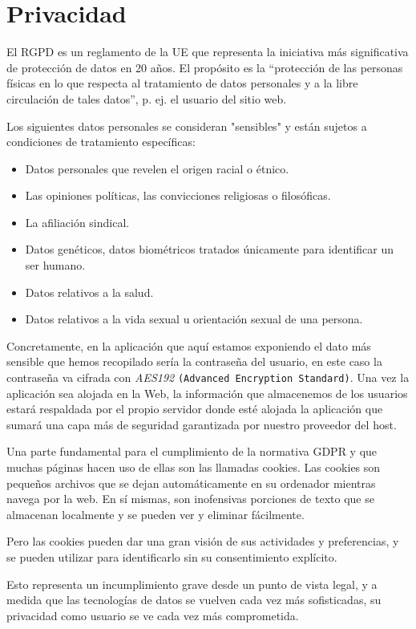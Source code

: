 \documentclass[a4paper, 12pt]{book}
\begin{document}
\section{Privacidad}
El RGPD es un reglamento de la UE que representa la iniciativa más significativa de protección de datos en 20 años. El propósito es la “protección de las personas físicas en lo que respecta al tratamiento de datos personales y a la libre circulación de tales datos”, p. ej. el usuario del sitio web.
 
Los siguientes datos personales se consideran "sensibles" y están sujetos a condiciones de tratamiento específicas:

\begin{itemize}
  \item Datos personales que revelen el origen racial o étnico.
  \item Las opiniones políticas, las convicciones religiosas o filosóficas.
  \item La afiliación sindical.
  \item Datos genéticos, datos biométricos tratados únicamente para identificar un ser humano.
  \item Datos relativos a la salud.
  \item Datos relativos a la vida sexual u orientación sexual de una persona.
\end{itemize}

Concretamente, en la aplicación que aquí estamos exponiendo el dato más sensible que hemos recopilado sería la contraseña del usuario, en este caso la contraseña va cifrada con \textit{AES192} \texttt{(Advanced Encryption Standard)}. Una vez la aplicación sea alojada en la Web, la información que almacenemos de los usuarios estará respaldada por el propio servidor donde esté alojada la aplicación que sumará una capa más de seguridad garantizada por nuestro proveedor del host.

Una parte fundamental para el cumplimiento de la normativa GDPR y que muchas páginas hacen uso de ellas son las llamadas cookies. 
Las cookies son pequeños archivos que se dejan automáticamente en su ordenador mientras navega por la web. En sí mismas, son inofensivas porciones de texto que se almacenan localmente y se pueden ver y eliminar fácilmente.

Pero las cookies pueden dar una gran visión de sus actividades y preferencias, y se pueden utilizar para identificarlo sin su consentimiento explícito.

Esto representa un incumplimiento grave desde un punto de vista legal, y a medida que las tecnologías de datos se vuelven cada vez más sofisticadas, su privacidad como usuario se ve cada vez más comprometida.
\end{document}
